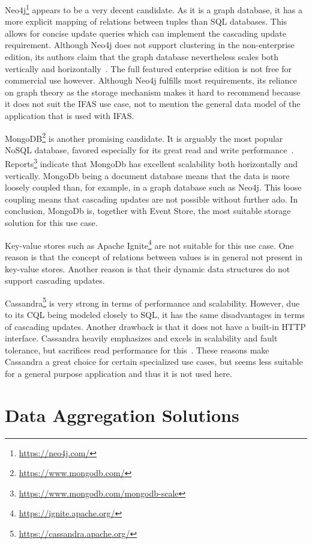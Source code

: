Neo4j\footnote{\url{https://neo4j.com/}} appears to be a very decent candidate.
As it is a graph database, it has a more explicit mapping of relations between tuples than \ac{SQL} databases.
This allows for concise update queries which can implement the cascading update requirement.
Although Neo4j does not support clustering in the non-enterprise edition, its authors claim that the graph database nevertheless scales both vertically and horizontally~\cite{...}.
The full featured enterprise edition is not free for commercial use however.
Although Neo4j fulfills most requirements, its reliance on graph theory as the storage mechanism makes it hard to recommend because it does not suit the \ac{IFAS} use case, not to mention the general data model of the application that is used with \ac{IFAS}.

MongoDB\footnote{\url{https://www.mongodb.com/}} is another promising candidate.
It is arguably the most popular NoSQL database, favored especially for its great read and write performance~\cite{6625441}.
Reports\footnote{\url{https://www.mongodb.com/mongodb-scale}} indicate that MongoDb has excellent scalability both horizontally and vertically.
MongoDb being a document database means that the data is more loosely coupled than, for example, in a graph database such as Neo4j.
This loose coupling means that cascading updates are not possible without further ado.
In conclusion, MongoDb is, together with Event Store, the most suitable storage solution for this use case.

Key-value stores such as Apache Ignite\footnote{\url{https://ignite.apache.org/}} are not suitable for this use case.
One reason is that the concept of relations between values is in general not present in key-value stores.
Another reason is that their dynamic data structures do not support cascading updates.

Cassandra\footnote{\url{https://cassandra.apache.org/}} is very strong in terms of performance and scalability.
However, due to its \ac{CQL} being modeled closely to \ac{SQL}, it has the same disadvantages in terms of cascading updates.
Another drawback is that it does not have a built-in HTTP interface.
Cassandra heavily emphasizes and excels in scalability and fault tolerance, but sacrifices read performance for this~\cite{6625441}.
These reasons make Cassandra a great choice for certain specialized use cases, but seems less suitable for a general purpose application and thus it is not used here.

\section{Data Aggregation Solutions}
\label{sec:classifications:aggregation}

